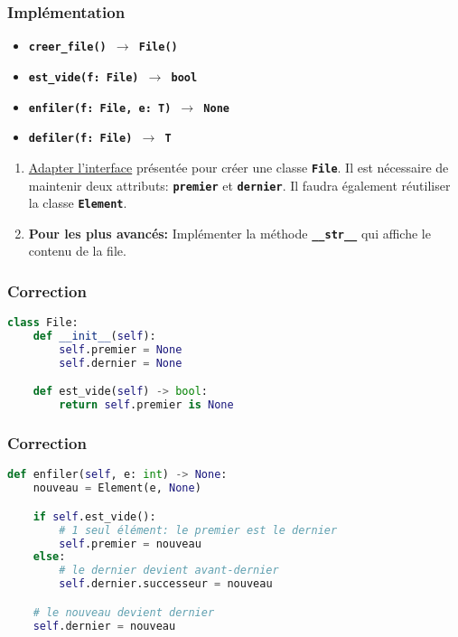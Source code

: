 \documentclass[svgnames,11pt]{beamer}
\begin{document}
\begin{frame}
    \frametitle{Implémentation}

    \begin{itemize}
        \item \texttt{\textbf{creer\_file() $\rightarrow$ File()}}
        \item \texttt{\textbf{est\_vide(f: File) $\rightarrow$ bool}}
        \item \texttt{\textbf{enfiler(f: File, e: T) $\rightarrow$ None}}
        \item \texttt{\textbf{defiler(f: File) $\rightarrow$ T}}
        \end{itemize}

        \begin{activite}
            \begin{enumerate}
                \item \underline{Adapter l'interface} présentée pour créer une classe \textbf{\texttt{File}}. Il est nécessaire de maintenir deux attributs: \textbf{\texttt{premier}} et \textbf{\texttt{dernier}}. Il faudra également réutiliser la classe \textbf{\texttt{Element}}.
                \item \textbf{Pour les plus avancés:} Implémenter la méthode \textbf{\texttt{\_\_str\_\_}} qui affiche le contenu de la file.
            \end{enumerate}
        \end{activite}
\end{frame}
\begin{frame}[fragile]
    \frametitle{Correction}

\begin{lstlisting}[language=Python , basicstyle=\ttfamily\small, xleftmargin=2em, xrightmargin=2em]
class File:
    def __init__(self):
        self.premier = None
        self.dernier = None

    def est_vide(self) -> bool:
        return self.premier is None
\end{lstlisting}

\end{frame}
\begin{frame}[fragile]
    \frametitle{Correction}

\begin{lstlisting}[language=Python , basicstyle=\ttfamily\small, xleftmargin=2em, xrightmargin=2em]
def enfiler(self, e: int) -> None:
    nouveau = Element(e, None)

    if self.est_vide():
        # 1 seul élément: le premier est le dernier
        self.premier = nouveau
    else:
        # le dernier devient avant-dernier
        self.dernier.successeur = nouveau

    # le nouveau devient dernier
    self.dernier = nouveau
\end{lstlisting}

\end{frame}
\end{document}
